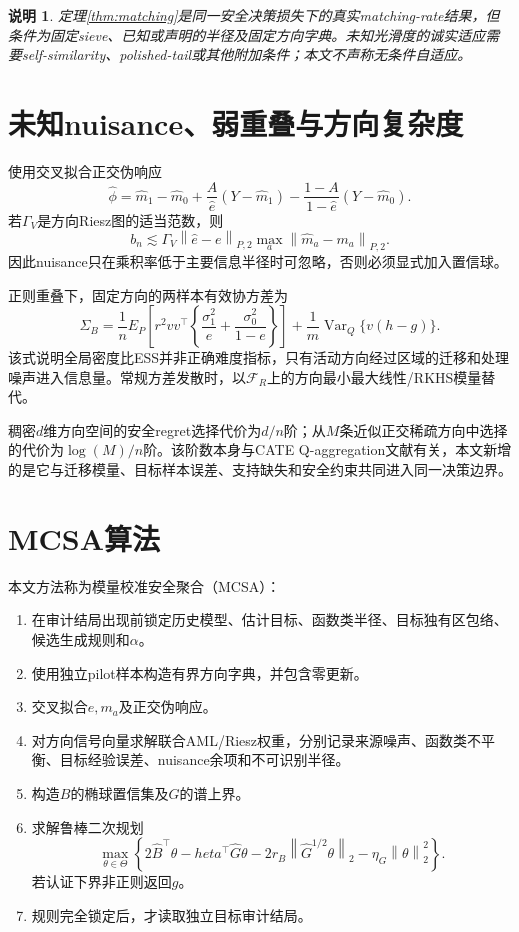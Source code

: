 \documentclass[UTF8,12pt]{ctexart}
\newtheorem{remark}{说明}
\newcommand{\F}{\mathcal F}
\newcommand{\norm}[1]{\left\lVert #1\right\rVert}
\begin{document}
\begin{remark}
定理\ref{thm:matching}是同一安全决策损失下的真实matching-rate结果，但条件为固定sieve、已知或声明的半径及固定方向字典。未知光滑度的诚实适应需要self-similarity、polished-tail或其他附加条件；本文不声称无条件自适应。
\end{remark}

\section{未知nuisance、弱重叠与方向复杂度}
使用交叉拟合正交伪响应
\[
\widehat\phi=\widehat m_1-\widehat m_0
+\frac A{\widehat e}(Y-\widehat m_1)
-\frac{1-A}{1-\widehat e}(Y-\widehat m_0).
\]
若$\Gamma_V$是方向Riesz图的适当范数，则
\[
b_n
\lesssim
\Gamma_V
\norm{\widehat e-e}_{P,2}
\max_a\norm{\widehat m_a-m_a}_{P,2}.
\]
因此nuisance只在乘积率低于主要信息半径时可忽略，否则必须显式加入置信球。

正则重叠下，固定方向的两样本有效协方差为
\[
\Sigma_B=
\frac1nE_P\left[
 r^2vv^\top\left\{
\frac{\sigma_1^2}{e}+
\frac{\sigma_0^2}{1-e}
\right\}
\right]
+
\frac1m\operatorname{Var}_Q\{v(h-g)\}.
\]
该式说明全局密度比ESS并非正确难度指标，只有活动方向经过区域的迁移和处理噪声进入信息量。常规方差发散时，以$\F_R$上的方向最小最大线性/RKHS模量替代。

稠密$d$维方向空间的安全regret选择代价为$d/n$阶；从$M$条近似正交稀疏方向中选择的代价为$\log(M)/n$阶。该阶数本身与CATE Q-aggregation文献有关，本文新增的是它与迁移模量、目标样本误差、支持缺失和安全约束共同进入同一决策边界。

\section{MCSA算法}
本文方法称为模量校准安全聚合（MCSA）：
\begin{enumerate}[label=步骤\arabic*.]
\item 在审计结局出现前锁定历史模型、估计目标、函数类半径、目标独有区包络、候选生成规则和$\alpha$。
\item 使用独立pilot样本构造有界方向字典，并包含零更新。
\item 交叉拟合$e,m_a$及正交伪响应。
\item 对方向信号向量求解联合AML/Riesz权重，分别记录来源噪声、函数类不平衡、目标经验误差、nuisance余项和不可识别半径。
\item 构造$B$的椭球置信集及$G$的谱上界。
\item 求解鲁棒二次规划
\[
\max_{\theta\in\Theta}
\left\{
2\widehat B^\top\theta-	heta^\top\widehat G\theta
-2r_B\norm{\widehat G^{1/2}\theta}_2
-\eta_G\norm\theta_2^2
\right\}.
\]
若认证下界非正则返回$g$。
\item 规则完全锁定后，才读取独立目标审计结局。
\end{enumerate}
\end{document}
